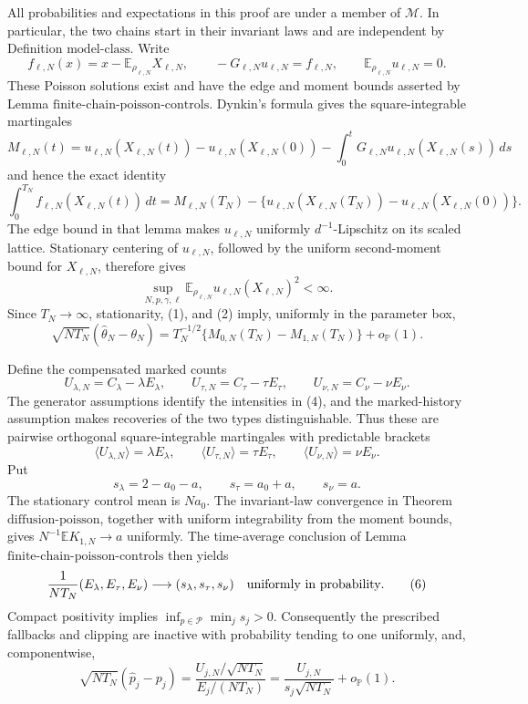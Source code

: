 All probabilities and expectations in this proof are under a member of \(\mathcal M\).  In particular, the two chains start in their invariant laws and are independent by Definition \(\mathrm{model\mbox{-}class}\).  Write
\[
 f_{\ell,N}(x)=x-\mathbb E_{\rho_{\ell,N}}X_{\ell,N},
 \qquad -G_{\ell,N}u_{\ell,N}=f_{\ell,N},
 \qquad \mathbb E_{\rho_{\ell,N}}u_{\ell,N}=0.
\]
These Poisson solutions exist and have the edge and moment bounds asserted by Lemma \(\mathrm{finite\mbox{-}chain\mbox{-}poisson\mbox{-}controls}\).  Dynkin's formula gives the square-integrable martingales
\[
 M_{\ell,N}(t)=u_{\ell,N}(X_{\ell,N}(t))-u_{\ell,N}(X_{\ell,N}(0))
 -\int_0^tG_{\ell,N}u_{\ell,N}(X_{\ell,N}(s))\,ds
\]
and hence the exact identity
\[
 \int_0^{T_N}f_{\ell,N}(X_{\ell,N}(t))\,dt
 =M_{\ell,N}(T_N)-
 \{u_{\ell,N}(X_{\ell,N}(T_N))-u_{\ell,N}(X_{\ell,N}(0))\}.       \tag{1}
\]
The edge bound in that lemma makes \(u_{\ell,N}\) uniformly \(d^{-1}\)-Lipschitz on its scaled lattice.  Stationary centering of \(u_{\ell,N}\), followed by the uniform second-moment bound for \(X_{\ell,N}\), therefore gives
\[
 \sup_{N,p,\gamma,\ell}\mathbb E_{\rho_{\ell,N}}u_{\ell,N}(X_{\ell,N})^2<\infty. \tag{2}
\]
Since \(T_N\to\infty\), stationarity, (1), and (2) imply, uniformly in the parameter box,
\[
 \sqrt{NT_N}(\widehat\theta_N-\theta_N)
 =T_N^{-1/2}\{M_{0,N}(T_N)-M_{1,N}(T_N)\}+o_{\mathbb P}(1).       \tag{3}
\]

Define the compensated marked counts
\[
 U_{\lambda,N}=C_\lambda-\lambda E_\lambda,
 \qquad U_{\tau,N}=C_\tau-\tau E_\tau,
 \qquad U_{\nu,N}=C_\nu-\nu E_\nu.                              \tag{4}
\]
The generator assumptions identify the intensities in (4), and the marked-history assumption makes recoveries of the two types distinguishable.  Thus these are pairwise orthogonal square-integrable martingales with predictable brackets
\[
 \langle U_{\lambda,N}\rangle=\lambda E_\lambda,
 \qquad \langle U_{\tau,N}\rangle=\tau E_\tau,
 \qquad \langle U_{\nu,N}\rangle=\nu E_\nu.                     \tag{5}
\]
Put
\[
 s_\lambda=2-a_0-a,
 \qquad s_\tau=a_0+a,
 \qquad s_\nu=a.
\]
The stationary control mean is \(Na_0\).  The invariant-law convergence in Theorem \(\mathrm{diffusion\mbox{-}poisson}\), together with uniform integrability from the moment bounds, gives \(N^{-1}\mathbb E K_{1,N}\to a\) uniformly.  The time-average conclusion of Lemma \(\mathrm{finite\mbox{-}chain\mbox{-}poisson\mbox{-}controls}\) then yields
\[
 \frac{1}{NT_N}(E_\lambda,E_\tau,E_\nu)
 \longrightarrow(s_\lambda,s_\tau,s_\nu)
 \quad\hbox{uniformly in probability}.                           \tag{6}
\]
Compact positivity implies \(\inf_{p\in\mathcal P}\min_j s_j>0\).  Consequently the prescribed fallbacks and clipping are inactive with probability tending to one uniformly, and, componentwise,
\[
 \sqrt{NT_N}(\widehat p_j-p_j)
 =\frac{U_{j,N}/\sqrt{NT_N}}{E_j/(NT_N)}
 =\frac{U_{j,N}}{s_j\sqrt{NT_N}}+o_{\mathbb P}(1).               \tag{7}
\]

